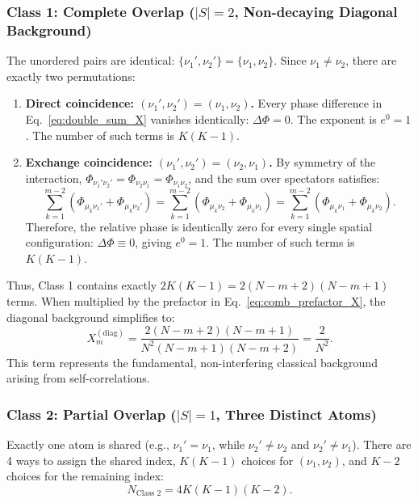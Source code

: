 \documentclass[11pt,a4paper]{article}
\begin{document}
\subsubsection{Class 1: Complete Overlap ($|S| = 2$, Non-decaying Diagonal Background)}
The unordered pairs are identical: $\{\nu_1', \nu_2'\} = \{\nu_1, \nu_2\}$. Since $\nu_1 \ne \nu_2$, there are exactly two permutations:
\begin{enumerate}
    \item \textbf{Direct coincidence: $(\nu_1', \nu_2') = (\nu_1, \nu_2)$.}  
    Every phase difference in Eq.~\eqref{eq:double_sum_X} vanishes identically: $\Delta \Phi = 0$. The exponent is $e^0 = 1$. The number of such terms is $K(K - 1)$.
    \item \textbf{Exchange coincidence: $(\nu_1', \nu_2') = (\nu_2, \nu_1)$.}  
    By symmetry of the interaction, $\Phi_{\nu_1' \nu_2'} = \Phi_{\nu_2 \nu_1} = \Phi_{\nu_1 \nu_2}$, and the sum over spectators satisfies:
    \begin{equation}
        \sum_{k=1}^{m-2} (\Phi_{\mu_k \nu_1'} + \Phi_{\mu_k \nu_2'}) = \sum_{k=1}^{m-2} (\Phi_{\mu_k \nu_2} + \Phi_{\mu_k \nu_1}) = \sum_{k=1}^{m-2} (\Phi_{\mu_k \nu_1} + \Phi_{\mu_k \nu_2}).
    \end{equation}
    Therefore, the relative phase is identically zero for every single spatial configuration: $\Delta \Phi \equiv 0$, giving $e^0 = 1$. The number of such terms is $K(K - 1)$.
\end{enumerate}
Thus, Class 1 contains exactly $2 K(K - 1) = 2(N - m + 2)(N - m + 1)$ terms. When multiplied by the prefactor in Eq.~\eqref{eq:comb_prefactor_X}, the diagonal background simplifies to:
\begin{equation}
    X_m^{(\text{diag})} = \frac{2(N - m + 2)(N - m + 1)}{N^2 (N - m + 1)(N - m + 2)} = \frac{2}{N^2}.
    \label{eq:Xm_diag}
\end{equation}
This term represents the fundamental, non-interfering classical background arising from self-correlations.

\subsubsection{Class 2: Partial Overlap ($|S| = 1$, Three Distinct Atoms)}
Exactly one atom is shared (e.g., $\nu_1' = \nu_1$, while $\nu_2' \ne \nu_2$ and $\nu_2' \ne \nu_1$). There are 4 ways to assign the shared index, $K(K - 1)$ choices for $(\nu_1, \nu_2)$, and $K - 2$ choices for the remaining index:
\begin{equation}
    N_{\text{Class 2}} = 4 K(K - 1)(K - 2).
\end{equation}
\end{document}
